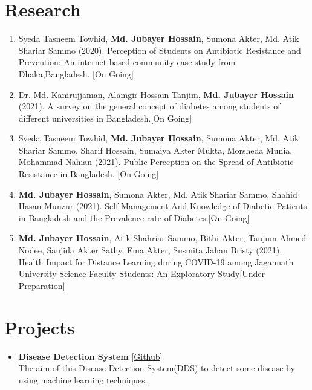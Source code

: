 \documentclass[11pt,a4paper]{moderncv}
\begin{document}
\section{Research}
\begin{enumerate}
	\item Syeda Tasneem Towhid, \textbf{Md. Jubayer Hossain}, Sumona Akter, Md. 
	Atik Shariar Sammo (2020). Perception of Students on Antibiotic Resistance 
	and Prevention: An internet-based community case study from 
	Dhaka,Bangladesh. \hfill [On Going]
	\item Dr. Md. Kamrujjaman, Alamgir Hossain Tanjim, \textbf{Md. Jubayer 
	Hossain} (2021). A survey on the general concept of diabetes among students 
	of different universities in Bangladesh.\hfill [On Going] 
	\item Syeda Tasneem Towhid, \textbf{Md. Jubayer Hossain}, Sumona Akter, Md. 
	Atik Shariar Sammo, Sharif Hossain, Sumaiya Akter Mukta, Morsheda Munia, 
	Mohammad Nahian (2021). Public Perception on the Spread of Antibiotic 
	Resistance in Bangladesh. \hfill [On Going]
	\item\textbf{ Md. Jubayer Hossain}, Sumona Akter, Md. Atik Shariar Sammo, 
	Shahid Hasan Munzur (2021). Self Management And Knowledge of Diabetic 
	Patients in Bangladesh and the Prevalence rate of Diabetes.\hfill [On Going]
	\item \textbf{Md. Jubayer Hossain}, Atik Shahriar Sammo, Bithi Akter, 
	Tanjum Ahmed Nodee, Sanjida Akter Sathy, Ema Akter, Susmita Jahan Bristy 
	(2021). Health 
	Impact for Distance Learning during COVID-19 among Jagannath University 
	Science Faculty Students: An Exploratory Study\hfill [Under Preparation]

\end{enumerate}

\section{Projects}
\begin{itemize}	
	\item\textbf{Disease Detection System} 
	\hfill [\href{https://github.com/hdrobd/DDS}{Github}]\\
	The aim of this Disease Detection System(DDS) to detect some disease by 
	using machine learning techniques.
\end{itemize}
\end{document}
